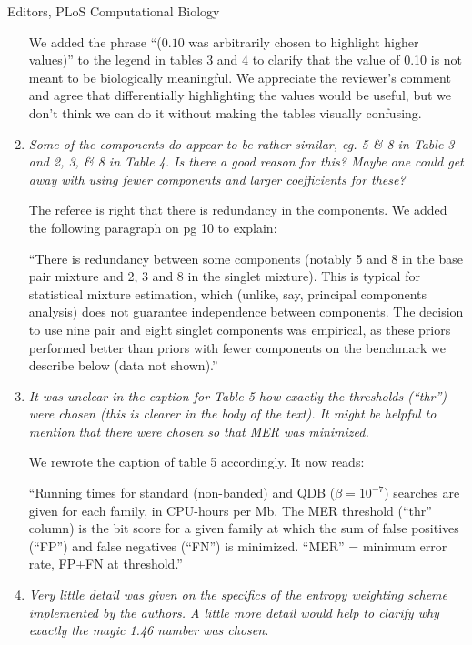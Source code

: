 \documentclass{jfrcletter}
\begin{document}
\begin{letter}{Editors, PLoS Computational Biology}
\begin{enumerate}
   We added the phrase ``($0.10$ was arbitrarily chosen to highlight
   higher values)'' to the legend in tables 3 and 4 to clarify that the
   value of 0.10 is not meant to be biologically meaningful.  We
   appreciate the reviewer's comment and agree that differentially
   highlighting the values would be useful, but we don't think we can
   do it without making the tables visually confusing.

\item \emph{\footnotesize Some of the components do appear to be rather similar,
   eg. 5 \& 8 in Table 3 and 2, 3, \& 8 in Table 4. Is there a good
   reason for this? Maybe one could get away with using fewer
   components and larger coefficients for these? }

   The referee is right that there is redundancy in the components.
   We added the following paragraph on pg 10 to explain:

   ``There is redundancy between some components (notably 5
   and 8 in the base pair mixture and 2, 3 and 8 in the singlet
   mixture). This is typical for statistical mixture estimation, which
   (unlike, say, principal components analysis) does not guarantee
   independence between components. The decision to use nine pair
   and eight singlet components was empirical, as these priors
   performed better than priors with fewer components on the benchmark
   we describe below (data not shown).''

\item \emph{\footnotesize It was unclear in the caption for Table 5 how exactly the
   thresholds (``thr'') were chosen (this is clearer in the body of the
   text). It might be helpful to mention that there were chosen so
   that MER was minimized.}

   We rewrote the caption of table 5 accordingly. It now reads:

   ``Running times for standard (non-banded) and QDB ($\beta=10^{-7}$)
   searches are given for each family, in CPU-hours per Mb.  The MER
   threshold (``thr'' column) is the bit score for a given family at
   which the sum of false positives (``FP'') and false negatives
   (``FN'') is minimized. ``MER'' = minimum error rate, FP+FN at
   threshold.''

\item \emph{\footnotesize Very little detail was given on the specifics of the
   entropy weighting scheme implemented by the authors. A little more
   detail would help to clarify why exactly the magic 1.46 number was
   chosen.}


\end{enumerate}
\end{letter}
\end{document}
